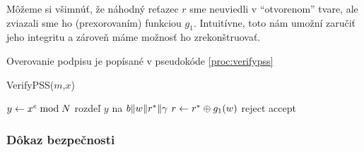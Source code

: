 Môžeme si všimnúť, že náhodný reťazec $r$ sme neuviedli v
``otvorenom'' tvare, ale zviazali sme ho (prexorovaním) funkciou $g_1$. 
Intuitívne,
toto nám umožní zaručiť jeho integritu a zároveň máme možnosť ho
zrekonštruovať.

Overovanie podpisu je popísané v pseudokóde \ref{proc:verifypss}

\begin{procedure}
    \caption{VerifyPSS($m$,$x$)}
    \label{proc:verifypss}
    $y \leftarrow x^e \bmod N$\;
    rozdeľ $y$ na $b \| w \| r^* \| \gamma$\;
    $r \leftarrow r^* \oplus g_1(w)$\;
    {%
        \Return reject\;
    }{%
        \Return accept\;
    }
\end{procedure}


\subsubsection{Dôkaz bezpečnosti}

